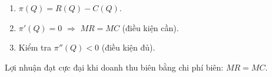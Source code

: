 \documentclass[12pt,a4paper]{article}
\begin{document}
\begin{phuongphap}[title={Tìm mức sản lượng tối đa hóa lợi nhuận}]
  \begin{enumerate}
    \item $\pi(Q) = R(Q) - C(Q)$.
    \item $\pi'(Q) = 0$ $\Rightarrow$ $MR = MC$ (điều kiện cần).
    \item Kiểm tra $\pi''(Q) < 0$ (điều kiện đủ).
  \end{enumerate}
\end{phuongphap}

\begin{dinhly}
  Lợi nhuận đạt cực đại khi doanh thu biên bằng chi phí biên: $MR = MC$.
\end{dinhly}
\end{document}
